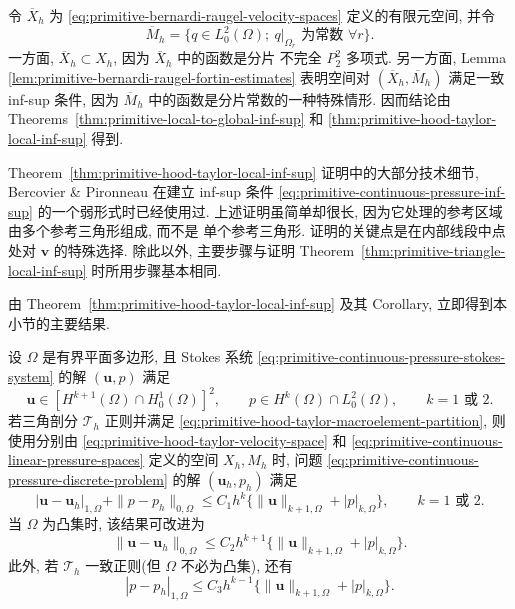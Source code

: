 \begin{Proof}
令 $\overline X_h$ 为 \eqref{eq:primitive-bernardi-raugel-velocity-spaces}
定义的有限元空间, 并令
\[
\overline M_h=\{q\in L_0^2(\Omega);
\ q|_{\Omega_r}\text{ 为常数 }\forall r\}.
\]
一方面, $\overline X_h\subset X_h$, 因为 $\overline X_h$ 中的函数是分片
不完全 $P_2^2$ 多项式. 另一方面, Lemma
\ref{lem:primitive-bernardi-raugel-fortin-estimates} 表明空间对
$(\overline X_h,\overline M_h)$ 满足一致 inf-sup 条件, 因为
$\overline M_h$ 中的函数是分片常数的一种特殊情形. 因而结论由
Theorems~\ref{thm:primitive-local-to-global-inf-sup} 和
\ref{thm:primitive-hood-taylor-local-inf-sup} 得到.
\end{Proof}

\setcounter{statement}{0}
\renewcommand{\theHstatement}{remark.\thesection.\arabic{statement}}
\begin{Remark}\label{rem:primitive-hood-taylor-proof-comparison}
Theorem~\ref{thm:primitive-hood-taylor-local-inf-sup} 证明中的大部分技术细节,
Bercovier \& Pironneau 在建立 inf-sup 条件
\eqref{eq:primitive-continuous-pressure-inf-sup} 的一个弱形式时已经使用过.
上述证明虽简单却很长, 因为它处理的参考区域由多个参考三角形组成, 而不是
单个参考三角形. 证明的关键点是在内部线段中点处对 $\mathbf v$ 的特殊选择.
除此以外, 主要步骤与证明 Theorem~\ref{thm:primitive-triangle-local-inf-sup}
时所用步骤基本相同.
\end{Remark}

由 Theorem~\ref{thm:primitive-hood-taylor-local-inf-sup} 及其 Corollary,
立即得到本小节的主要结果.

\setcounter{statement}{2}
\renewcommand{\theHstatement}{theorem.\thesection.\arabic{statement}}
\begin{Theorem}\label{thm:primitive-hood-taylor-error}
设 $\Omega$ 是有界平面多边形, 且 Stokes 系统
\eqref{eq:primitive-continuous-pressure-stokes-system} 的解 $(\mathbf u,p)$ 满足
\[
\mathbf u\in[H^{k+1}(\Omega)\cap H_0^1(\Omega)]^2,
\qquad p\in H^k(\Omega)\cap L_0^2(\Omega),
\qquad k=1\text{ 或 }2.
\]
若三角剖分 $\mathcal T_h$ 正则并满足
\eqref{eq:primitive-hood-taylor-macroelement-partition}, 则使用分别由
\eqref{eq:primitive-hood-taylor-velocity-space} 和
\eqref{eq:primitive-continuous-linear-pressure-spaces} 定义的空间 $X_h,M_h$ 时,
问题 \eqref{eq:primitive-continuous-pressure-discrete-problem} 的解
$(\mathbf u_h,p_h)$ 满足
\begin{equation}\label{eq:primitive-hood-taylor-h1-pressure-error}
|\mathbf u-\mathbf u_h|_{1,\Omega}+\|p-p_h\|_{0,\Omega}
\leq C_1h^k\{\|\mathbf u\|_{k+1,\Omega}+|p|_{k,\Omega}\},
\qquad k=1\text{ 或 }2.
\end{equation}
当 $\Omega$ 为凸集时, 该结果可改进为
\begin{equation}\label{eq:primitive-hood-taylor-l2-error}
\|\mathbf u-\mathbf u_h\|_{0,\Omega}
\leq C_2h^{k+1}\{\|\mathbf u\|_{k+1,\Omega}+|p|_{k,\Omega}\}.
\end{equation}
此外, 若 $\mathcal T_h$ 一致正则(但 $\Omega$ 不必为凸集), 还有
\begin{equation}\label{eq:primitive-hood-taylor-pressure-h1-error}
|p-p_h|_{1,\Omega}
\leq C_3h^{k-1}\{\|\mathbf u\|_{k+1,\Omega}+|p|_{k,\Omega}\}.
\end{equation}
\end{Theorem}

